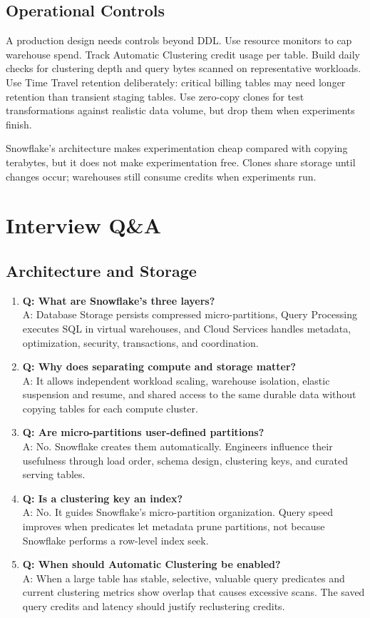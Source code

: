 \subsection{Operational Controls}
A production design needs controls beyond DDL. Use resource monitors to cap warehouse spend. Track Automatic Clustering credit usage per table. Build daily checks for clustering depth and query bytes scanned on representative workloads. Use Time Travel retention deliberately: critical billing tables may need longer retention than transient staging tables. Use zero-copy clones for test transformations against realistic data volume, but drop them when experiments finish.

\begin{notebox}
Snowflake's architecture makes experimentation cheap compared with copying terabytes, but it does not make experimentation free. Clones share storage until changes occur; warehouses still consume credits when experiments run.
\end{notebox}

\section{Interview Q\&A}
\subsection{Architecture and Storage}
\begin{enumerate}
    \item \textbf{Q: What are Snowflake's three layers?}\\
    A: Database Storage persists compressed micro-partitions, Query Processing executes SQL in virtual warehouses, and Cloud Services handles metadata, optimization, security, transactions, and coordination.
    \item \textbf{Q: Why does separating compute and storage matter?}\\
    A: It allows independent workload scaling, warehouse isolation, elastic suspension and resume, and shared access to the same durable data without copying tables for each compute cluster.
    \item \textbf{Q: Are micro-partitions user-defined partitions?}\\
    A: No. Snowflake creates them automatically. Engineers influence their usefulness through load order, schema design, clustering keys, and curated serving tables.
    \item \textbf{Q: Is a clustering key an index?}\\
    A: No. It guides Snowflake's micro-partition organization. Query speed improves when predicates let metadata prune partitions, not because Snowflake performs a row-level index seek.
    \item \textbf{Q: When should Automatic Clustering be enabled?}\\
    A: When a large table has stable, selective, valuable query predicates and current clustering metrics show overlap that causes excessive scans. The saved query credits and latency should justify reclustering credits.
\end{enumerate}

